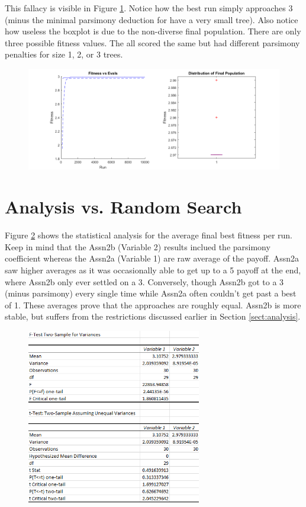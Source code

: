 \documentclass[11pt]{article}
\begin{document}
This fallacy is visible in Figure \ref{fig:default}. Notice how the best run simply approaches 3 (minus the minimal parsimony deduction for have a very small tree). Also notice how useless the boxplot is due to the non-diverse final population. There are only three possible fitness values. The all scored the same but had different parsimony penalties for size 1, 2, or 3 trees.

\begin{figure}[ht]
\centering
\includegraphics[width=6in]{default.png}
\label{fig:default}
\end{figure}

\section{Analysis vs. Random Search}\label{sect:vs_random}

Figure \ref{fig:stats} shows the statistical analysis for the average final best fitness per run. Keep in mind that the Assn2b (Variable 2) results inclued the parsimony coefficient whereas the Assn2a (Variable 1) are raw average of the payoff. Assn2a saw higher averages as it was occasionally able to get up to a 5 payoff at the end, where Assn2b only ever settled on a 3.  Conversely, though Assn2b got to a 3 (minus parsimony) every single time while Assn2a often couldn't get past a best of 1. These averages prove that the approaches are roughly equal. Assn2b is more stable, but suffers from the restrictions discussed earlier in Section \ref{sect:analysis}.

\begin{figure}[ht]
\centering
\includegraphics[width=3in]{stats.png}
\label{fig:stats}
\end{figure}
\end{document}
